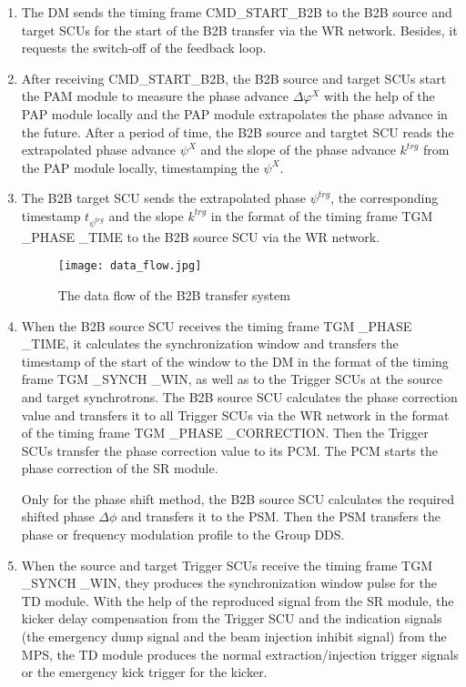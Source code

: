 \begin{enumerate}
\item The DM sends the timing frame CMD\_START\_B2B to the B2B source and target SCUs for the start of the B2B transfer via the WR network. Besides, it requests the switch-off of the feedback loop.

\item  After receiving CMD\_START\_B2B, the B2B source and target SCUs start the PAM module to measure the phase advance $\Delta \varphi^X$ with the help of the PAP module locally and the PAP module extrapolates the phase advance in the future. After a period of time, the B2B source and targtet SCU reads the extrapolated phase advance $\psi^X$ and the slope of the phase advance $k^\mathit{trg}$ from the PAP module locally, timestamping the $\psi^X$.  

\item  The B2B target SCU sends the extrapolated phase $\psi^\mathit{trg}$, the corresponding timestamp $t_{\psi^\mathit{trg}}$ and the slope $k^\mathit{trg}$ in the format of the timing frame TGM \_PHASE \_TIME to the B2B source SCU via the WR network. 
\begin{figure}[!htb]
   \centering   
   \texttt{[image: data\_flow.jpg]}
   \caption{The data flow of the B2B transfer system}
   \label{data_flow}
\end{figure}  

\item  When the B2B source SCU receives the timing frame TGM \_PHASE \_TIME, it calculates the synchronization window and transfers the timestamp of the start of the window to the DM in the format of the timing frame TGM \_SYNCH \_WIN, as well as to the Trigger SCUs at the source and target synchrotrons.
The B2B source SCU calculates the phase correction value and transfers it to all Trigger SCUs via the WR network in the format of the timing frame TGM \_PHASE \_CORRECTION. Then the Trigger SCUs transfer the phase correction value to its \gls{PCM}. The PCM starts the phase correction of the SR module. 

Only for the phase shift method, the B2B source SCU calculates the required shifted phase $\Delta \phi$ and transfers it to the PSM. Then the PSM transfers the phase or frequency modulation profile to the Group DDS.  

\item  When the source and target Trigger SCUs receive the timing frame TGM \_SYNCH \_WIN, they produces the synchronization window pulse for the TD module. With the help of the reproduced signal from the SR module, the kicker delay compensation from the Trigger SCU and the indication signals (the emergency dump signal and the beam injection inhibit signal) from the MPS, the TD module produces the normal extraction/injection trigger signals or the emergency kick trigger for the kicker.  


\end{enumerate}
